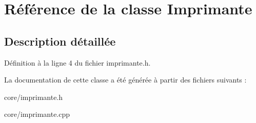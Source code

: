 \hypertarget{class_imprimante}{
\section{Référence de la classe Imprimante}
\label{d5/dad/class_imprimante}
}


\subsection{Description détaillée}


Définition à la ligne 4 du fichier imprimante.h.



La documentation de cette classe a été générée à partir des fichiers suivants :\begin{DoxyCompactItemize}
\item 
core/imprimante.h\item 
core/imprimante.cpp\end{DoxyCompactItemize}
